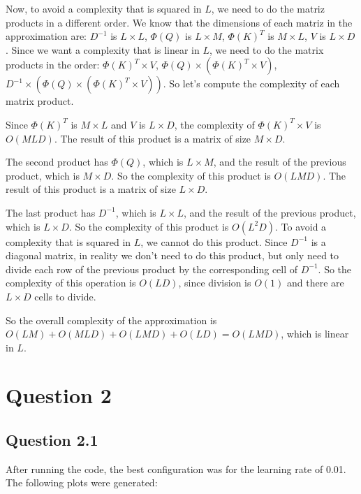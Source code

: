 \documentclass{article}
\begin{document}
\bigskip

Now, to avoid a complexity that is squared in $L$, we need to do the matriz products in a different order. We know that the dimensions of each matriz in the approximation are:
$D^{-1}$ is $L\times L$, $\Phi(Q)$ is $L\times M$, $\Phi(K)^T$ is $M\times L$, $V$ is $L\times D$. Since we want a complexity that is linear in $L$, we need to do the matrix products in the order:
$\Phi(K)^T \times V$, $\Phi(Q) \times (\Phi(K)^T \times V)$, $D^{-1} \times (\Phi(Q) \times (\Phi(K)^T \times V))$. So let's compute the complexity of each matrix product.

\bigskip

Since $\Phi(K)^T$ is $M\times L$ and $V$ is $L\times D$, the complexity of $\Phi(K)^T \times V$ is $O(M L D)$. The result of this product is a matrix of size $M\times D$.

The second product has $\Phi(Q)$, which is $L\times M$, and the result of the previous product, which is $M\times D$. So the complexity of this product is $O(L M D)$. 
The result of this product is a matrix of size $L\times D$.

The last product has $D^{-1}$, which is $L\times L$, and the result of the previous product, which is $L\times D$. So the complexity of this product is $O(L^2 D)$. 
To avoid a complexity that is squared in $L$, we cannot do this product. Since $D^{-1}$ is a diagonal matrix, in reality we don't need to do this product, but only need to divide
each row of the previous product by the corresponding cell of $D^{-1}$. So the complexity of this operation is $O(L D)$, since division is $O(1)$ and there are 
$L \times D$ cells to divide.

\bigskip

So the overall complexity of the approximation is $O(L M) + O(M L D) + O(L M D) + O(L D) = O(L M D)$, which is linear in $L$.

\section{Question 2}

\subsection{Question 2.1}
After running the code, the best configuration was for the learning rate of 0.01.
The following plots were generated:
\end{document}
